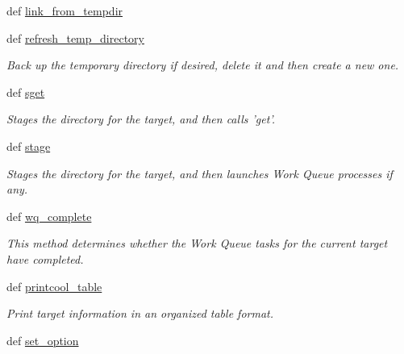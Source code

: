 \begin{DoxyCompactItemize}
def \hyperlink{classforcebalance_1_1target_1_1Target_a5aa4958cea0a48138511567a076c5a82}{link\-\_\-from\-\_\-tempdir}
\item 
def \hyperlink{classforcebalance_1_1target_1_1Target_afe815eafab06ac92f10bbf4b88ad95c8}{refresh\-\_\-temp\-\_\-directory}
\begin{DoxyCompactList}\small\item\em \-Back up the temporary directory if desired, delete it and then create a new one. \end{DoxyCompactList}\item 
def \hyperlink{classforcebalance_1_1target_1_1Target_a51d58b55242bf4d4909c1837174f5f3c}{sget}
\begin{DoxyCompactList}\small\item\em \-Stages the directory for the target, and then calls 'get'. \end{DoxyCompactList}\item 
def \hyperlink{classforcebalance_1_1target_1_1Target_af8d2a4658c87841e40296795aec478bb}{stage}
\begin{DoxyCompactList}\small\item\em \-Stages the directory for the target, and then launches \-Work \-Queue processes if any. \end{DoxyCompactList}\item 
def \hyperlink{classforcebalance_1_1target_1_1Target_af6099ec09486213869dba2491bd8ea04}{wq\-\_\-complete}
\begin{DoxyCompactList}\small\item\em \-This method determines whether the \-Work \-Queue tasks for the current target have completed. \end{DoxyCompactList}\item 
def \hyperlink{classforcebalance_1_1target_1_1Target_ac30a4e9d7d9fe06f7caefa5f7cfab09b}{printcool\-\_\-table}
\begin{DoxyCompactList}\small\item\em \-Print target information in an organized table format. \end{DoxyCompactList}\item 
def \hyperlink{classforcebalance_1_1BaseClass_a73e9a37a7632e79eb99f49bd15aced45}{set\-\_\-option}
\end{DoxyCompactItemize}
